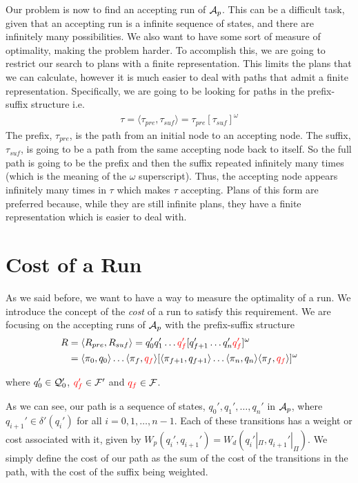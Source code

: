 Our problem is now to find an accepting run of $\mathcal{A}_p$. This can be a difficult task, given that an accepting run is a infinite sequence of states, and there are infinitely many possibilities. We also want to have some sort of measure of optimality, making the problem harder. To accomplish this, we are going to restrict our search to plans with a finite representation. This limits the plans that we can calculate, however it is much easier to deal with paths that admit a finite representation. Specifically, we are going to be looking for paths in the prefix-suffix structure i.e.\
\begin{align*}
\tau = \langle \tau_{pre}, \tau_{suf} \rangle = \tau_{pre} [\tau_{suf}]^\omega
\end{align*}
The prefix, $\tau_{pre}$, is the path from an initial node to an accepting node. The suffix, $\tau_{suf}$, is going to be a path from the same accepting node back to itself. So the full path is going to be the prefix and then the suffix repeated infinitely many times (which is the meaning of the $\omega$ superscript). Thus, the accepting node appears infinitely many times in $\tau$ which makes $\tau$ accepting. Plans of this form are preferred because, while they are still infinite plans, they have a finite representation which is easier to deal with.

\section{Cost of a Run}
As we said before, we want to have a way to measure the optimality of a run. We introduce the concept of the \textit{cost} of a run to satisfy this requirement. We are focusing on the accepting runs of $\mathcal{A}_p$ with the prefix-suffix structure
\begin{align*}
R &= \langle R_{pre}, R_{suf} \rangle = q_0' q_1' \dots {\color{red} q_f'} [q_{f+1}' \dots q_n' {\color{red} q_f'}]^\omega \\
&= \langle \pi_0, q_0 \rangle \dots   \langle {\color{black} \pi_f} , {\color{red} q_f} \rangle [ \langle \pi_{f+1} , q_{f+1} \rangle \dots \langle \pi_{n}, q_n \rangle \langle {\color{black} \pi_f} , {\color{red} q_f} \rangle ]^\omega
\end{align*} 

where $q_0' \in \mathcal{Q}_0'$, ${\color{red} q_f'} \in \mathcal{F}'$ and ${\color{red} q_f} \in \mathcal{F}$. 

As we can see, our path is a sequence of states, $q_0',q_1',\dots,q_n'$ in $\mathcal{A}_p$, where $q_{i+1}' \in \delta' (q_i')$ for all $i=0,1, \dots, n-1$. Each of these transitions has a weight or cost associated with it, given by $W_p(q_i',q_{i+1}') = W_d(q_i'|_\Pi , q_{i+1}'|_\Pi)$. We simply define the cost of our path as the sum of the cost of the transitions in the path, with the cost of the suffix being weighted.

